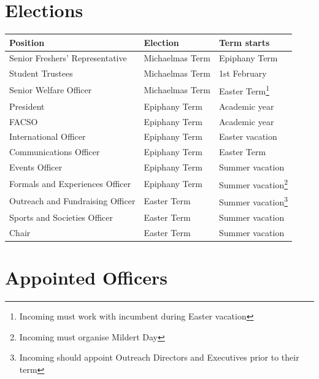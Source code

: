 \documentclass[12pt]{article}
\begin{document}
    \section{Elections}
    \begin{longtable}{|l|l|l|}
        \hline
        \textbf{Position} & \textbf{Election} & \textbf{Term starts} \\
        \hline\hline
        \endhead
        \hline
        \endfoot

        Senior Freshers' Representative         & Michaelmas Term           & Epiphany Term \\
        Student Trustees                        & Michaelmas Term           & 1st February \\
        Senior Welfare Officer                  & Michaelmas Term           & Easter Term\footnote{Incoming must work with incumbent during Easter vacation} \\

        President                               & Epiphany Term             & Academic year \\
        FACSO                                   & Epiphany Term             & Academic year \\
        International Officer                   & Epiphany Term             & Easter vacation \\
        Communications Officer                  & Epiphany Term             & Easter Term \\
        Events Officer                          & Epiphany Term             & Summer vacation \\
        Formals and Experiences Officer         & Epiphany Term             & Summer vacation\footnote{Incoming must organise Mildert Day} \\

        Outreach and Fundraising Officer        & Easter Term               & Summer vacation\footnote{Incoming should appoint Outreach Directors and Executives prior to their term} \\
        Sports and Societies Officer            & Easter Term               & Summer vacation \\
        Chair                                   & Easter Term               & Summer vacation \\
    \end{longtable}


    \section{Appointed Officers}
\end{document}
